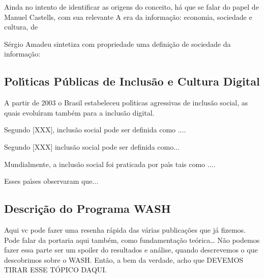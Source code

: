 \documentclass[
12pt,		%
openright,	%
twoside,  %
a4paper,			%
chapter=TITLE,		%
english,			%
french,				%
spanish,			%
brazil				%
]{USPSC-classe/USPSC}
\begin{document}
Ainda no intento de identificar as origens do conceito, h\'a que se falar do papel de Manuel Castells, com sua relevante \textquotedbl A era da informa\c{c}\~ao: economia, sociedade e cultura, de 


S\'ergio Amadeu sintetiza com propriedade uma defini\c{c}\~ao de sociedade da informa\c{c}\~ao: 



\noindent\begin{center}\mbox{\centering{}}\end{center}


\subsection[Pol\'{\i}ticas P\'ublicas de Inclus\~ao e Cultura Digital]{Pol\'{\i}ticas P\'ublicas de Inclus\~ao e Cultura Digital}\label{Pol\'{\i}ticas P\'ublicas de Inclus\~ao e Cultura Digital}
A partir de 2003 o Brasil estabeleceu pol\'{\i}ticas agressivas de inclus\~ao social, as quais evolu\'{\i}ram tamb\'em para a inclus\~ao digital.


Segundo [XXX], inclus\~ao social pode ser definida como ....


Segundo [XXX] inclus\~ao social pode ser definida como...


Mundialmente, a inclus\~ao social foi praticada por pa\'{\i}s tais como ....


Esses pa\'{\i}ses observaram que...


\subsection[Descri\c{c}\~ao do Programa WASH]{Descri\c{c}\~ao do Programa WASH}\label{Descri\c{c}\~ao do Programa WASH}
Aqui vc pode fazer uma resenha r\'apida das v\'arias publica\c{c}\~oes que j\'a fizemos. Pode falar da portaria aqui tamb\'em, como fundamenta\c{c}\~ao te\'orica… N\~ao podemos fazer essa parte ser um spoiler do resultados e an\'alise, quando descrevemos o que descobrimos sobre o WASH. Ent\~ao, a bem da verdade, acho que DEVEMOS TIRAR ESSE T\'OPICO DAQUI.
\end{document}
